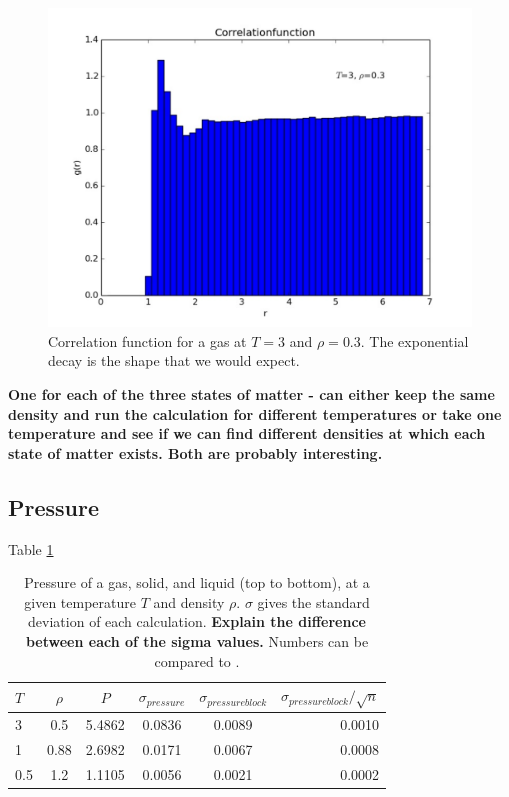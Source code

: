 \documentclass{article}
\begin{document}
\begin{multicols}{2}
\begin{figure}[H]
\begin{center}
\includegraphics[width=\linewidth]{plots/correlationfunctionT3Rho03x.pdf}
\caption{Correlation function for a gas at $T=3$ and $\rho = 0.3$.  The exponential decay is the shape that we would expect.}
\label{corgas}
\end{center}
\end{figure}

\textbf{One for each of the three states of matter - can either keep the same density and run the calculation for different temperatures or take one temperature and see if we can find different densities at which each state of matter exists.  Both are probably interesting.}

\subsection{Pressure}

Table \ref{pressuretab}

\begin{table}
\begin{center}
\begin{tabular}{| l | c | c | c | c | r |}
\hline  $T$ & $\rho$ & $P$ & $\sigma_{pressure}$ & $\sigma_{pressureblock}$ & $\sigma_{pressureblock}/ \sqrt n$ \\ \hline
  3 & 0.5 & 5.4862 & 0.0836 & 0.0089 & 0.0010 \\ \hline
  1 & 0.88 & 2.6982 & 0.0171 & 0.0067 & 0.0008 \\ \hline
  0.5 & 1.2 & 1.1105 & 0.0056 & 0.0021 & 0.0002 \\ \hline
\end{tabular}
\label{pressuretab}
\caption{Pressure of a gas, solid, and liquid (top to bottom), at a given temperature $T$ and density $\rho$.  $\sigma$ gives the standard deviation of each calculation.  \textbf{Explain the difference between each of the sigma values.}  Numbers can be compared to \cite{thijssen}.}
\end{center}
\end{table}


\end{multicols}
\end{document}
